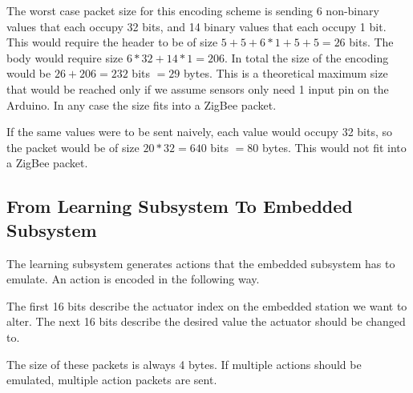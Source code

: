 The worst case packet size for this encoding scheme is sending 6 non-binary values that each occupy 32 bits, and 14 binary values that each occupy 1 bit. This would require the header to be of size $5 + 5 + 6 * 1 + 5 + 5 = 26$ bits. The body would require size $6 * 32 + 14 * 1 = 206$. In total the size of the encoding would be $26 + 206 = 232$ bits $= 29$ bytes. This is a theoretical maximum size that would be reached only if we assume sensors only need 1 input pin on the Arduino. In any case the size fits into a ZigBee packet.

If the same values were to be sent naively, each value would occupy 32 bits, so the packet would be of size $20 * 32 = 640$ bits $=80$ bytes. This would not fit into a ZigBee packet.

\subsection{From  Learning Subsystem To Embedded Subsystem}

The learning subsystem generates actions that the embedded subsystem has to emulate. An action is encoded in the following way.

The first 16 bits describe the actuator index on the embedded station we want to alter. The next 16 bits describe the desired value the actuator should be changed to.

The size of these packets is always 4 bytes. If multiple actions should be emulated, multiple action packets are sent.

